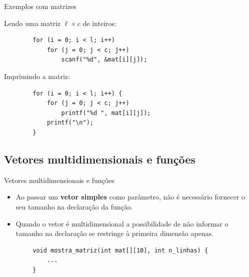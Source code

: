 \documentclass[handout]{beamer}
\begin{document}
\begin{frame}[fragile]{Exemplos com matrizes}

    Lendo uma matriz $\ell \times c$ de inteiros:

    \begin{verbatim}
        for (i = 0; i < l; i++)
            for (j = 0; j < c; j++)
                scanf("%d", &mat[i][j]);
    \end{verbatim}

    \pause

    Imprimindo a matriz:

    \begin{verbatim}
        for (i = 0; i < l; i++) {
            for (j = 0; j < c; j++)
                printf("%d ", mat[i][j]);
            printf("\n");
        }
    \end{verbatim}

\end{frame}


\subsection{Vetores multidimensionais e funções}

\begin{frame}[fragile]{Vetores multidimensionais e funções}

    \begin{itemize}
        \item Ao passar um {\bf vetor simples} como parâmetro, não é necessário fornecer o seu tamanho na declaração da função.

        \item Quando o vetor é {multidimensional} a possibilidade de não informar o tamanho na declaração se restringe à primeira dimensão apenas.
    \end{itemize}

    \begin{verbatim}
        void mostra_matriz(int mat[][10], int n_linhas) {
            ...
        }
    \end{verbatim}

\end{frame}
\end{document}
